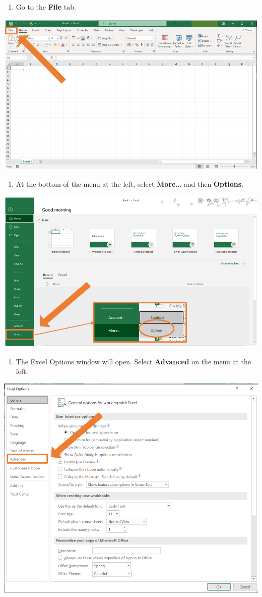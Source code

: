 \documentclass[
]{book}
\providecommand{\tightlist}{%
  \setlength{\itemsep}{0pt}\setlength{\parskip}{0pt}}
\begin{document}
\begin{enumerate}
\def\labelenumi{\arabic{enumi}.}
\tightlist
\item
  Go to the \textbf{File} tab.
\end{enumerate}

\begin{center}\includegraphics[width=0.6\linewidth]{Figures/decimal_step1} \end{center}

\begin{enumerate}
\def\labelenumi{\arabic{enumi}.}
\setcounter{enumi}{1}
\tightlist
\item
  At the bottom of the menu at the left, select \textbf{More\ldots{}} and then \textbf{Options}.
\end{enumerate}

\begin{center}\includegraphics[width=0.6\linewidth]{Figures/Decimal_step2} \end{center}

\begin{enumerate}
\def\labelenumi{\arabic{enumi}.}
\setcounter{enumi}{2}
\tightlist
\item
  The Excel Options window will open. Select \textbf{Advanced} on the menu at the left.
\end{enumerate}

\begin{center}\includegraphics[width=0.6\linewidth]{Figures/Decimal_step3} \end{center}
\end{document}

